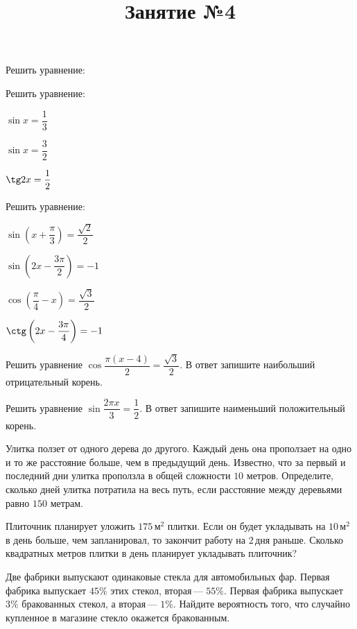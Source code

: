 \newpage
\title{Занятие №4}
\begin{listofex}
		\item Решить уравнение:
	\begin{enumcols}[itemcolumns=2]
		\item {}
		\item {}
		\item {}
		\item {}
		\item {}
		\item {}
		\item {}
	\end{enumcols}
	\item Решить уравнение:
	\begin{enumcols}[itemcolumns=3]
		\item \( \sin x = \dfrac{1}{3} \)
		\item \( \sin x = \dfrac{3}{2}\)
		\item \( \tg 2x = \dfrac{1}{2}\)
	\end{enumcols}
	\item Решить уравнение:
	\begin{enumcols}[itemcolumns=2]
		\item \( \sin \left( x+\dfrac{\pi}{3} \right) = \dfrac{\sqrt{2}}{2} \)
		\item \( \sin \left( 2x-\dfrac{3\pi}{2} \right) = -1 \)
		\item \( \cos \left( \dfrac{\pi}{4}-x \right)=\dfrac{\sqrt{3}}{2} \)
		\item \( \ctg\left( 2x-\dfrac{3\pi}{4} \right)=-1 \)
	\end{enumcols}
	\item Решить уравнение \( \cos\dfrac{\pi(x-4)}{2}=\dfrac{\sqrt{3}}{2} \). В ответ запишите наибольший отрицательный корень.
	\item Решить уравнение \( \sin\dfrac{2\pi x}{3}=\dfrac{1}{2} \). В ответ запишите наименьший положительный корень.
	\item {}
	\item Улитка ползет от одного дерева до другого. Каждый день она проползает на одно и то же расстояние больше, чем в предыдущий день. Известно, что за первый и последний дни улитка проползла в общей сложности \( 10 \) метров. Определите, сколько дней улитка потратила на весь путь, если расстояние между деревьями равно \( 150 \) метрам.
	\item Плиточник планирует уложить \( 175 \) м\( ^2 \) плитки. Если он будет укладывать на \( 10 \) м\( ^2 \) в день больше, чем запланировал, то закончит работу на \( 2 \) дня раньше. Сколько квадратных метров плитки в день планирует укладывать плиточник? 
	\item Две фабрики выпускают одинаковые стекла для автомобильных фар. Первая фабрика выпускает \( 45\% \) этих стекол, вторая --- \( 55\% \). Первая фабрика выпускает \( 3\% \) бракованных стекол, а вторая — \( 1\% \). Найдите вероятность того, что случайно купленное в магазине стекло окажется бракованным.
\end{listofex}
